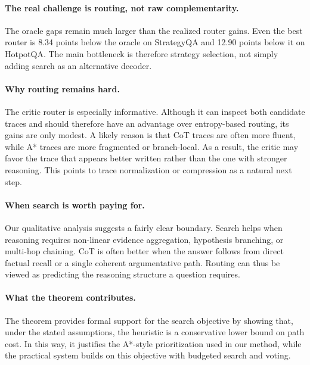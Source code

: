 \documentclass[11pt]{article}
\begin{document}
\paragraph{The real challenge is routing, not raw complementarity.}
The oracle gaps remain much larger than the realized router gains. Even the best router is 8.34 points below the oracle on StrategyQA and 12.90 points below it on HotpotQA. The main bottleneck is therefore strategy selection, not simply adding search as an alternative decoder.

\paragraph{Why routing remains hard.}
The critic router is especially informative. Although it can inspect both candidate traces and should therefore have an advantage over entropy-based routing, its gains are only modest. A likely reason is that CoT traces are often more fluent, while A* traces are more fragmented or branch-local. As a result, the critic may favor the trace that appears better written rather than the one with stronger reasoning. This points to trace normalization or compression as a natural next step.

\paragraph{When search is worth paying for.}
Our qualitative analysis suggests a fairly clear boundary. Search helps when reasoning requires non-linear evidence aggregation, hypothesis branching, or multi-hop chaining. CoT is often better when the answer follows from direct factual recall or a single coherent argumentative path. Routing can thus be viewed as predicting the reasoning structure a question requires.

\paragraph{What the theorem contributes.}
The theorem provides formal support for the search objective by showing that, under the stated assumptions, the heuristic is a conservative lower bound on path cost. In this way, it justifies the A*-style prioritization used in our method, while the practical system builds on this objective with budgeted search and voting.






\end{document}

